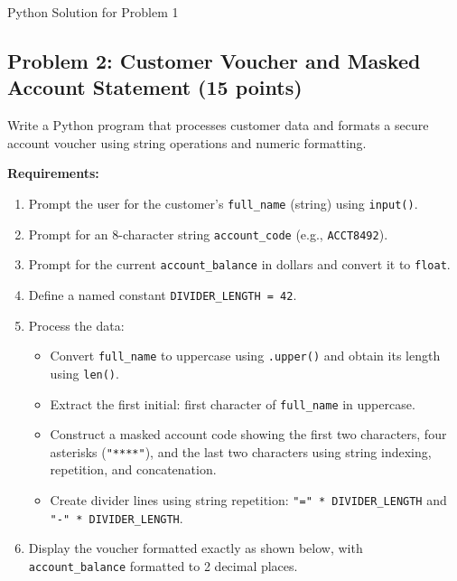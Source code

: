 \documentclass[11pt,a4paper]{article}
\begin{document}
\begin{answerbox}[height=14.0cm]{Python Solution for Problem 1}
\end{answerbox}

\newpage


\subsection*{Problem 2: Customer Voucher and Masked Account Statement (15 points)}
Write a Python program that processes customer data and formats a secure account voucher using string operations and numeric formatting.

\textbf{Requirements:}
\begin{enumerate}[leftmargin=2em,label=\arabic*.,itemsep=1.5pt]
  \item Prompt the user for the customer's \texttt{full\_name} (string) using \texttt{input()}.
  \item Prompt for an 8-character string \texttt{account\_code} (e.g., \texttt{ACCT8492}).
  \item Prompt for the current \texttt{account\_balance} in dollars and convert it to \texttt{float}.
  \item Define a named constant \texttt{DIVIDER\_LENGTH = 42}.
  \item Process the data:
  \begin{itemize}[itemsep=0.5pt,topsep=1pt]
    \item Convert \texttt{full\_name} to uppercase using \texttt{.upper()} and obtain its length using \texttt{len()}.
    \item Extract the first initial: first character of \texttt{full\_name} in uppercase.
    \item Construct a masked account code showing the first two characters, four asterisks (\texttt{"****"}), and the last two characters using string indexing, repetition, and concatenation.
    \item Create divider lines using string repetition: \texttt{"=" * DIVIDER\_LENGTH} and \texttt{"-" * DIVIDER\_LENGTH}.
  \end{itemize}
  \item Display the voucher formatted exactly as shown below, with \texttt{account\_balance} formatted to 2 decimal places.
\end{enumerate}
\end{document}
